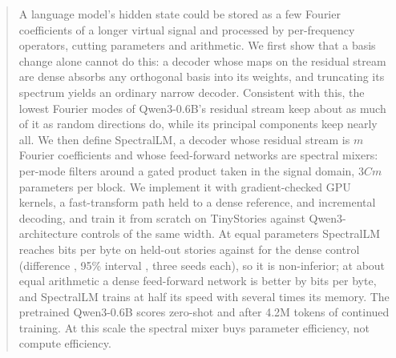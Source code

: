 
\begin{abstract}
A language model's hidden state could be stored as a few Fourier coefficients
of a longer virtual signal and processed by per-frequency operators, cutting
parameters and arithmetic. We first show that a basis change alone cannot do
this: a decoder whose maps on the residual stream are dense absorbs any
orthogonal basis into its weights, and truncating its spectrum yields an
ordinary narrow decoder. Consistent with this, the lowest Fourier modes of
Qwen3-0.6B's residual stream keep about as much of it as random directions
do, while its principal components keep nearly all. We then define
SpectralLM, a decoder whose residual stream is $m$ Fourier coefficients and
whose feed-forward networks are spectral mixers: per-mode filters around a
gated product taken in the signal domain, $3Cm$ parameters per block. We
implement it with gradient-checked GPU kernels, a fast-transform path held to
a dense reference, and incremental decoding, and train it from scratch on
TinyStories against Qwen3-architecture controls of the same width. At equal
parameters SpectralLM reaches \BpbS{} bits per byte on held-out stories
against \BpbQpar{} for the dense control (difference \DiffSQpar{}, 95\%
interval \DiffSQparCI{}, three seeds each), so it is non-inferior; at about
equal arithmetic a dense feed-forward network is better by \DiffSQstd{} bits
per byte, and SpectralLM trains at half its speed with several times its
memory. The pretrained Qwen3-0.6B scores \BpbQwen{} zero-shot and
\BpbQwenFt{} after 4.2M tokens of continued training. At this scale the
spectral mixer buys parameter efficiency, not compute efficiency.
\StatusAbstract
\end{abstract}
